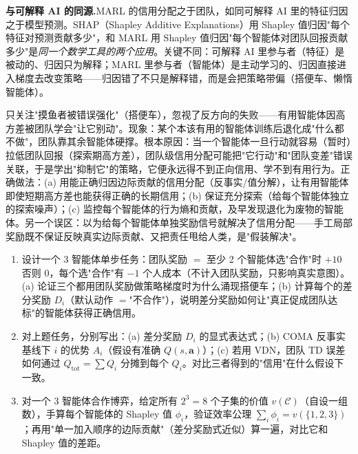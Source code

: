 \begin{note}
\textbf{与可解释 AI 的同源.}\;MARL 的信用分配之于团队，如同可解释 AI 里的特征归因之于模型预测。SHAP（Shapley Additive Explanations）用 Shapley 值归因"每个特征对预测贡献多少"，和 MARL 用 Shapley 值归因"每个智能体对团队回报贡献多少"是\emph{同一个数学工具的两个应用}。关键不同：可解释 AI 里参与者（特征）是被动的、归因只为解释；MARL 里参与者（智能体）是主动学习的、归因直接进入梯度去改变策略——归因错了不只是解释错，而是会把策略带偏（搭便车、懒惰智能体）。
\end{note}

\begin{pitfall}
只关注"摸鱼者被错误强化"（搭便车），忽视了反方向的失败——有用智能体因高方差被团队学会"让它别动"。现象：某个本该有用的智能体训练后退化成"什么都不做"，团队靠其余智能体硬撑。根本原因：当一个智能体一旦行动就容易（暂时）拉低团队回报（探索期高方差），团队级信用分配可能把"它行动"和"团队变差"错误关联，于是学出"抑制它"的策略，它便永远得不到正向信用、学不到有用行为。正确做法：(a) 用能正确归因边际贡献的信用分配（反事实/值分解），让有用智能体即使短期高方差也能获得正确的长期信用；(b) 保证充分探索（给每个智能体独立的探索噪声）；(c) 监控每个智能体的行为熵和贡献，及早发现退化为废物的智能体。另一个误区：以为给每个智能体单独奖励信号就解决了信用分配——手工局部奖励既不保证反映真实边际贡献、又把责任甩给人类，是"假装解决"。
\end{pitfall}

\begin{practice}
\begin{enumerate}
  \item 设计一个 3 智能体单步任务：团队奖励 $=$ 至少 2 个智能体选"合作"时 $+10$ 否则 $0$，每个选"合作"有 $-1$ 个人成本（不计入团队奖励，只影响真实意图）。(a) 论证三个都用团队奖励做策略梯度时为什么涌现搭便车；(b) 计算每个的差分奖励 $D_i$（默认动作 $=$"不合作"），说明差分奖励如何让"真正促成团队达标"的智能体获得正确信用。
  \item 对上题任务，分别写出：(a) 差分奖励 $D_i$ 的显式表达式；(b) COMA 反事实基线下 $i$ 的优势 $A_i$（假设有准确 $Q(s,\mathbf{a})$）；(c) 若用 VDN，团队 TD 误差如何通过 $Q_{\text{tot}}=\sum Q_i$ 分摊到每个 $Q_i$。对比三者得到的"信用"在什么假设下一致。
  \item 对一个 3 智能体合作博弈，给定所有 $2^3=8$ 个子集的价值 $v(\mathcal{C})$（自设一组数），手算每个智能体的 Shapley 值 $\phi_i$，验证效率公理 $\sum_i\phi_i=v(\{1,2,3\})$；再用"单一加入顺序的边际贡献"（差分奖励式近似）算一遍，对比它和 Shapley 值的差距。
\end{enumerate}
\end{practice}

